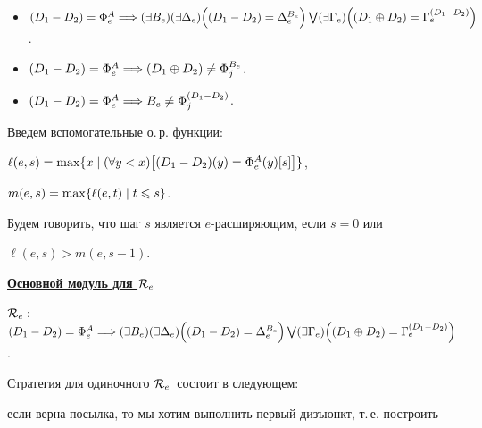 \begin{itemize}


\item[$\req{R}{e}:$] $\draz=\Phi_e^A\Longrightarrow


(\exists B_e)(\exists\Delta_e)\Bigl(\draz=\Delta_e^{B_e}\Bigr) \bigvee


(\exists\Gamma_e)\Bigl(\dsum=\Gamma_e^{\draz}\Bigr)$.


\item[$\req{N}{{e,j}}:$] $\draz=\Phi_e^A\Longrightarrow


\dsum\neq\Phi_j^{B_e}$.


\item[$\req{S}{{e,j}}:$] $\draz=\Phi_e^A\Longrightarrow


B_e\neq\Phi_j^{\draz}$.


\end{itemize}





Введем вспомогательные о.\,р. функции:





$\ell(e,s)=\max\{x\mid(\forall y<x)\bigl[\draz(y)=\Phi_e^A(y) [s]\bigr]\}$,





$m(e,s)=\max\{\ell(e,t)\mid t\leqslant s\}$.








Будем говорить, что шаг $s$ является $e$-расширяющим, если $s=0$ или


$\ell(e,s)>m(e,s-1)$.





\underline{\bf Основной модуль для ${\cal R}_e$}





\noindent $\req{R}{e}:$ $\draz=\Phi_e^A\Longrightarrow


(\exists B_e)(\exists\Delta_e)\Bigl(\draz=\Delta_e^{B_e}\Bigr) \bigvee


(\exists\Gamma_e)\Bigl(\dsum=\Gamma_e^{\draz}\Bigr)$.





\noindent Стратегия для одиночного ${\cal R}_e$\, состоит в следующем:


если верна посылка, то мы хотим выполнить первый дизъюнкт, т.\,е. построить


